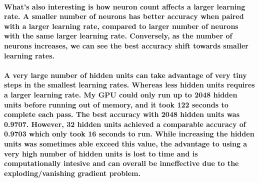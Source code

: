 \documentclass[10pt,a4paper]{report}
\begin{document}
\paragraph{
What's also interesting is how neuron count affects a larger learning rate. A smaller number of neurons has better accuracy when paired with a larger learning rate, compared to larger number of neurons with the same larger learning rate. Conversely, as the number of neurons increases, we can see the best accuracy shift towards smaller learning rates.
}

\paragraph{
 A very large number of hidden units can take advantage of very tiny steps in the smallest learning rates. Whereas less hidden units requires a larger learning rate. My GPU could only run up to 2048 hidden units before running out of memory, and it took 122 seconds to complete each pass. The best accuracy with 2048 hidden units was 0.9707. However, 32 hidden units achieved a comparable accuracy of 0.9703 which only took 16 seconds to run. While increasing the hidden units was sometimes able exceed this value, the advantage to using a very high number of hidden units is lost to time and is computationally intesive and can overall be inneffective due to the exploding/vanishing gradient problem.
}
\end{document}
